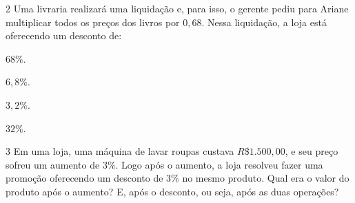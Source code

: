 
\num{2}  Uma livraria realizará uma liquidação e, para isso, o gerente pediu
para Ariane multiplicar todos os preços dos livros por $0,68$. Nessa
liquidação, a loja está oferecendo um desconto de:

\begin{escolha}
\item $68\%$.
\item $6,8\%$.
\item $3,2\%$.
\item $32\%$.
\end{escolha}



\num{3}  Em uma loja, uma máquina de lavar roupas custava $R\$ 1.500,00$, e seu
preço sofreu um aumento de $3\%$. Logo após o aumento, a loja resolveu
fazer uma promoção oferecendo um desconto de $3\%$ no mesmo produto. Qual
era o valor do produto após o aumento? E, após o desconto, ou seja, após as
duas operações?

